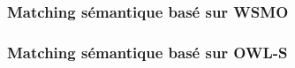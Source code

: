     \subsubsection{Matching sémantique basé sur WSMO}
    \label{sec:match-wsmo}
    \cite{paolucci2002semantic, keller2004wsmo}

    \subsubsection{Matching sémantique basé sur OWL-S}
    \label{sec:match-owls}
    \cite{paolucci2002semantic,benatallah2003request,
        benatallah2005automating, martin2004owl}







